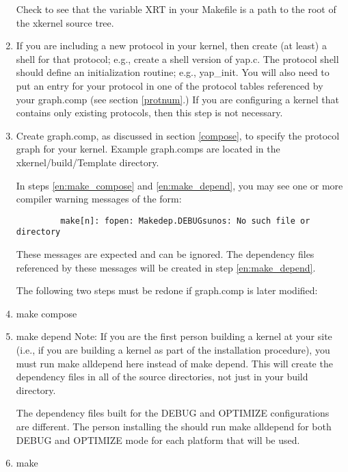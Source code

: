 \begin{enumerate}
Check to see that the variable XRT in your Makefile is a path to
the root of the xkernel source tree.


\item{}
If you are including a new protocol in your kernel, then create (at least)
a shell for that protocol; e.g., create a shell version of {\sanss yap.c}.
The protocol shell should define an initialization routine; 
e.g., {\sanss yap\_init}.  You will also need to put an entry for your
protocol in one of the protocol tables referenced by your graph.comp
(see section \ref{protnum}.)
If you are configuring a kernel that contains only existing protocols, 
then this step is not necessary.

\item{}
Create
{\sanss graph.comp}, as discussed in section \ref{compose},
to specify the protocol graph for your kernel.  Example graph.comps
are located in the {\sanss xkernel/build/Template} directory.

\smallskip

In steps \ref{en:make_compose} and
\ref{en:make_depend}, you may see one or more compiler warning messages of the
form:

\begin{verbatim}
         make[n]: fopen: Makedep.DEBUGsunos: No such file or directory
\end{verbatim}

These messages are expected and can be ignored.
The dependency files referenced by these messages will be created in
step \ref{en:make_depend}.

The following
two steps must be redone if {\sanss graph.comp} is later modified:
\item{}
\label{en:make_compose}
{\sanss make compose}

\item{}
\label{en:make_depend}
{\sanss make depend} 
Note:  If you are the first person building a kernel at your site
(i.e., if you are building a kernel as part of the installation
procedure), you must run {\sanss make alldepend} here instead of
{\sanss make depend.}  This will create the dependency files in all of
the source directories, not just in your build directory.

The dependency files built for the DEBUG and OPTIMIZE configurations
are different.  The person installing the \xk{} should run {\sanss
make alldepend} for both DEBUG and OPTIMIZE mode for each platform
that will be used.

\item{}
{\sanss make}

\end{enumerate}

